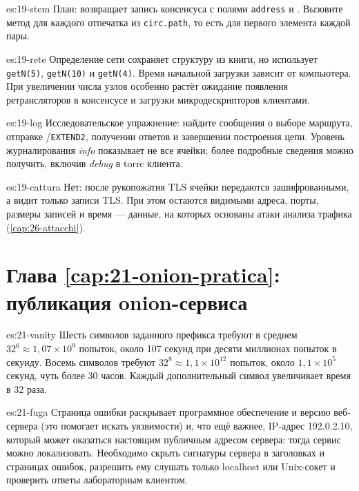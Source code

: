 \begin{soluzione}{es:19-stem}
План:  возвращает запись консенсуса с полями \texttt{address} и . Вызовите метод для каждого отпечатка из \texttt{circ.path}, то есть для первого элемента каждой пары.
\end{soluzione}

\begin{soluzione}{es:19-rete}
Определение сети сохраняет структуру из книги, но использует \texttt{getN(5)}, \texttt{getN(10)} и \texttt{getN(4)}. Время начальной загрузки зависит от компьютера. При увеличении числа узлов особенно растёт ожидание появления ретрансляторов в консенсусе и загрузки микродескрипторов клиентами.
\end{soluzione}

\begin{soluzione}{es:19-log}
Исследовательское упражнение: найдите сообщения о выборе маршрута, отправке /\texttt{EXTEND2}, получении ответов и завершении построения цепи. Уровень журналирования \emph{info} показывает не все ячейки; более подробные сведения можно получить, включив \emph{debug} в torrc клиента.
\end{soluzione}

\begin{soluzione}{es:19-cattura}
Нет: после рукопожатия TLS ячейки передаются зашифрованными, а  видит только записи TLS. При этом остаются видимыми адреса, порты, размеры записей и время — данные, на которых основаны атаки анализа трафика (\cref{cap:26-attacchi}).
\end{soluzione}

\section*{Глава \ref{cap:21-onion-pratica}: публикация onion-сервиса}

\begin{soluzione}{es:21-vanity}
Шесть символов заданного префикса требуют в среднем $32^6 \approx 1{,}07 \times 10^9$ попыток, около 107 секунд при десяти миллионах попыток в секунду. Восемь символов требуют $32^8 \approx 1{,}1 \times 10^{12}$ попыток, около $1{,}1 \times 10^5$ секунд, чуть более 30 часов. Каждый дополнительный символ увеличивает время в 32 раза.
\end{soluzione}

\begin{soluzione}{es:21-fuga}
Страница ошибки раскрывает программное обеспечение и версию веб-сервера (это помогает искать уязвимости) и, что ещё важнее, IP-адрес 192.0.2.10, который может оказаться настоящим публичным адресом сервера: тогда сервис можно локализовать. Необходимо скрыть сигнатуры сервера в заголовках и страницах ошибок, разрешить ему слушать только localhost или Unix-сокет и проверить ответы лабораторным клиентом.
\end{soluzione}

